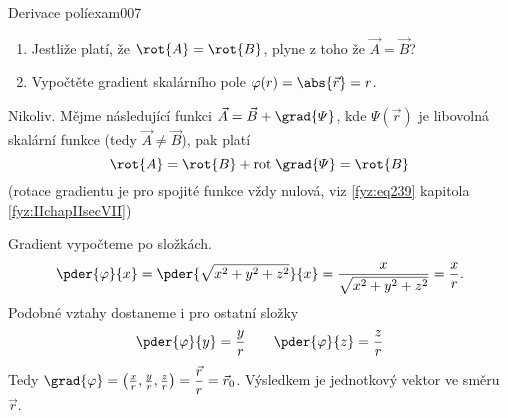 \begin{fyzexam}{Derivace polí}{exam007}
  \begin{enumerate}
    \item Jestliže platí, že \(\rot{A} = \rot{B}\), plyne z toho že \(\vec{A}=\vec{B}\)?
    \item Vypočtěte gradient skalárního pole \(\varphi(r) = \abs{\vec{r}} = r\).
  \end{enumerate}
  
  Nikoliv. Mějme následující funkci \(\vec{A} = \vec{B} + \grad{\varPsi}\), kde 
  \(\varPsi(\vec{r})\) je libovolná skalární funkce (tedy \(\vec{A}\neq\vec{B}\)), pak platí
  \[\rot{A} = \rot{B} +\mathrm{rot}\;\grad{\varPsi} = \rot{B}\] (rotace gradientu je pro 
  spojité funkce vždy nulová, viz \ref{fyz:eq239} kapitola \ref{fyz:IIchapIIsecVII})

  Gradient vypočteme po složkách.
  \begin{equation*}
    \pder{\varphi}{x} = \pder{\sqrt{x^2+y^2+z^2}}{x} = \dfrac{x}{\sqrt{x^2+y^2+z^2}} = \dfrac{x}{r}.
  \end{equation*}
  Podobné vztahy dostaneme i pro ostatní složky
  \begin{equation*}
    \pder{\varphi}{y} = \dfrac{y}{r} \qquad \pder{\varphi}{z} = \dfrac{z}{r}
  \end{equation*}
  Tedy \(\grad{\varphi} = \left(\frac{x}{r}, \frac{y}{r}, \frac{z}{r}\right) =
  \dfrac{\vec{r}}{r} = \vec{r}_0\). Výsledkem je jednotkový vektor ve směru \(\vec{r}\).
\end{fyzexam}